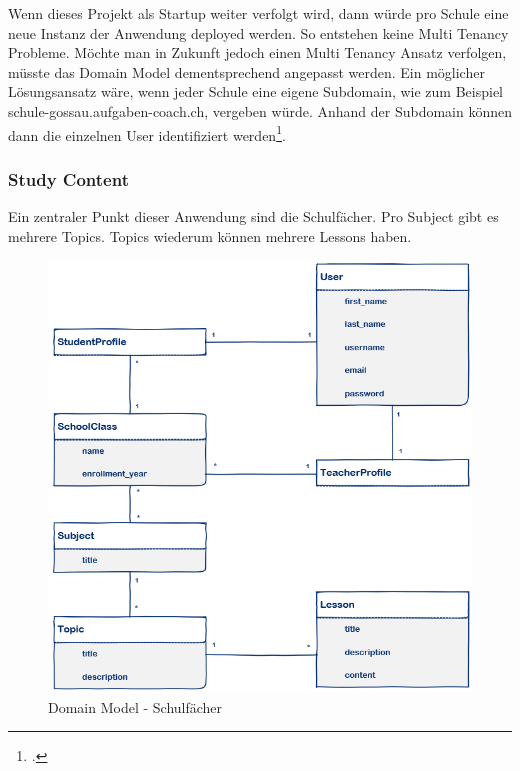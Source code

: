 Wenn dieses Projekt als Startup weiter verfolgt wird, dann würde pro Schule eine neue Instanz der Anwendung deployed werden. So entstehen keine Multi Tenancy Probleme. Möchte man in Zukunft jedoch einen Multi Tenancy Ansatz verfolgen, müsste das Domain Model dementsprechend angepasst werden. Ein möglicher Lösungsansatz wäre, wenn jeder Schule eine eigene Subdomain, wie zum Beispiel schule-gossau.aufgaben-coach.ch, vergeben würde. Anhand der Subdomain können dann die einzelnen User identifiziert werden\footcite{django:multi_tenancy}.

\subsubsection*{Study Content}
Ein zentraler Punkt dieser Anwendung sind die Schulfächer. Pro Subject gibt es mehrere Topics. Topics wiederum können mehrere Lessons haben. \\ 

\begin{figure}[H]
\begin{center}
	\includegraphics[width=\textwidth, keepaspectratio]{images/domain_model_study_content.png}
	\caption{Domain Model - Schulfächer}
	\label{fig:domain_model_study_content}
\end{center}
\end{figure}


